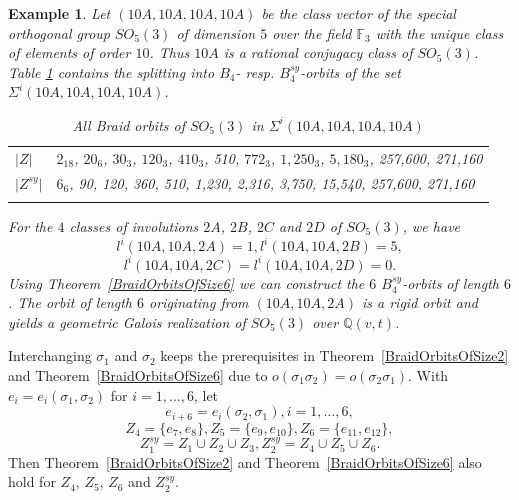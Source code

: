 \documentclass[12pt,a4paper]{article}
\newtheorem{example}{Example}[section]
\numberwithin{equation}{section}
\numberwithin{table}{section}
\begin{document}
%
\begin{example}
\label{SO53_10A10A10A1ASymmetric}
Let $(10A,10A,10A,10A)$ be the class vector of the special orthogonal group $SO_5(3)$ of dimension $5$ 
over the field $\mathbb{F}_3$ with the unique class of elements of order $10$.
Thus $10A$ is a rational conjugacy class of $SO_5(3)$.
Table  \ref{tab:Data_BraidOrbitsOfSO53} contains the splitting into $B_4$- resp. $B^{sy}_4$-orbits 
of the set $\Sigma^i(10A,10A,10A,10A)$.
%
\begin{table}[!htbp]
\centering
\footnotesize
\captionsetup{font=footnotesize}
\caption{All Braid orbits of $SO_5(3)$ in $\Sigma^i(10A,10A,10A,10A)$}
\label{tab:Data_BraidOrbitsOfSO53}
\begin{tabular}{ll}
\hline\noalign{\smallskip}
$\vert Z \vert$       & $2_{18}$, $20_6$, $30_3$, $120_3$, $410_3$, 510, $772_3$, $1,250_3$, $5,180_3$, 257,600, 271,160 \\
\noalign{\smallskip}\hline\noalign{\smallskip}
$\vert Z^{sy} \vert$  & $6_6$, 90, 120, 360, 510, 1,230, 2,316, 3,750, 15,540, 257,600, 271,160 \\
\noalign{\smallskip}\hline
\end{tabular}
\end{table}
%
\par
\noindent
For the $4$ classes of involutions $2A$, $2B$, $2C$ and $2D$ of $SO_5(3)$, we have 
$$l^i(10A,10A,2A)=1,l^i(10A,10A,2B)=5,$$
$$l^i(10A,10A,2C)=l^i(10A,10A,2D)=0.$$
Using Theorem~\ref{BraidOrbitsOfSize6} we can construct the $6$ $B^{sy}_4$-orbits of length $6$.
The orbit of length $6$ originating from $(10A,10A,2A)$ is a rigid orbit and
yields a geometric Galois realization of $SO_5(3)$ over $\mathbb{Q}(v,t)$.
\end{example}
%
\noindent
Interchanging $\sigma_1$ and $\sigma_2$ keeps the prerequisites in Theorem~\ref{BraidOrbitsOfSize2} and
Theorem~\ref{BraidOrbitsOfSize6} due to $o(\sigma_1 \sigma_2)=o(\sigma_2 \sigma_1)$.
With $e_i = e_i(\sigma_1, \sigma_2)$ for $i=1,\dots,6$, let 
$$e_{i+6} = e_i(\sigma_2, \sigma_1), i=1,\dots,6,$$
$$Z_4 = \{ e_7,e_8 \}, Z_5 = \{ e_9,e_{10} \},  Z_6 = \{ e_{11},e_{12} \},$$
$$Z^{sy}_1 = Z_1 \cup Z_2 \cup Z_3, Z^{sy}_2 = Z_4 \cup Z_5 \cup Z_6.$$
Then Theorem~\ref{BraidOrbitsOfSize2} and Theorem~\ref{BraidOrbitsOfSize6}
also hold for $Z_4$, $Z_5$, $Z_6$ and $Z^{sy}_2$.
%
\end{document}
